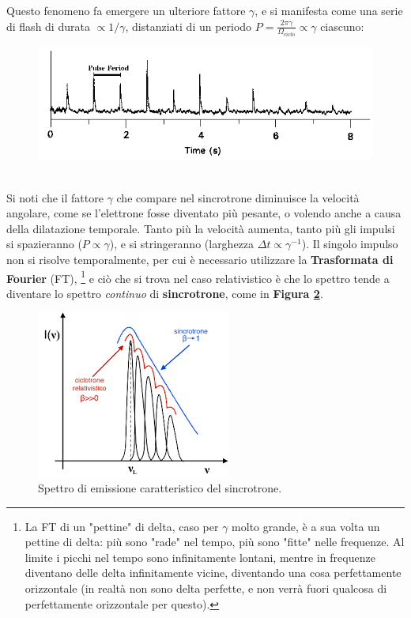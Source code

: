Questo fenomeno fa emergere un ulteriore fattore $\gamma$, e si manifesta come una serie di flash di durata $\propto 1/\gamma$, distanziati di un periodo $P=\frac{2\pi\gamma}{\Omega_{ciclo}}\propto\gamma$ ciascuno:
\begin{figure}[h!]
    \centering
    \includegraphics[width=0.5\linewidth]{Immagini/pulsar pulses.png}
    \label{fig: pulsi pulsars}
\end{figure}\\
Si noti che il fattore $\gamma$ che compare nel sincrotrone diminuisce la velocità angolare, come se l'elettrone fosse diventato più pesante, o volendo anche a causa della dilatazione temporale.
Tanto più la velocità aumenta, tanto più gli impulsi si spazieranno ($P\propto\gamma$), e si stringeranno (larghezza $\Delta t\propto\gamma^{-1}$).
Il singolo impulso non si risolve temporalmente, per cui è necessario utilizzare la \textbf{Trasformata di Fourier} (FT),
\footnote{
La FT di un "pettine" di delta, caso per $\gamma$ molto grande, è a sua volta un pettine di delta: più sono "rade" nel tempo, più sono "fitte" nelle frequenze.
Al limite i picchi nel tempo sono infinitamente lontani, mentre in frequenze diventano delle delta infinitamente vicine, diventando una cosa perfettamente orizzontale (in realtà non sono delta perfette, e non verrà fuori qualcosa di perfettamente orizzontale per questo).
}
e ciò che si trova nel caso relativistico è che lo spettro tende a diventare lo spettro \textit{continuo} di \textbf{sincrotrone}, come in \textbf{Figura \ref{fig: spettro di sincrotrone}}.
\begin{figure}[h!]
    \centering
    \includegraphics[width=0.4\linewidth]{Immagini/spettro sincrotrone.png}
    \caption{Spettro di emissione caratteristico del sincrotrone.}
    \label{fig: spettro di sincrotrone}
\end{figure}
